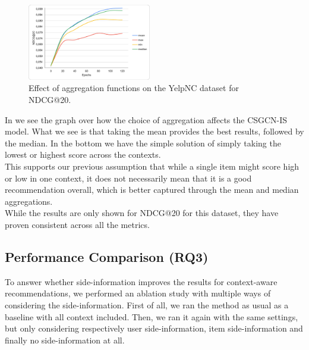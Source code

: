 \begin{figure}[hbt!]
	\centering
	\small	
	\includegraphics[width=0.48\textwidth]{figures/aggregation_effect.png}\vspace{-5pt}
	\caption{Effect of aggregation functions on the YelpNC dataset for NDCG@20.}\vspace{-10pt}
	\label{fig:aggregation_effect}
\end{figure}

In  we see the graph over how the choice of aggregation affects the CSGCN-IS model.
What we see is that taking the mean provides the best results, followed by the median.
In the bottom we have the simple solution of simply taking the lowest or highest score across the contexts.\\
This supports our previous assumption that while a single item might score high or low in one context, it does not necessarily mean that it is a good recommendation overall, which is better captured through the mean and median aggregations.\\
While the results are only shown for NDCG@20 for this dataset, they have proven consistent across all the metrics.



\subsection{Performance Comparison (RQ3)}
To answer whether side-information improves the results for context-aware recommendations, we performed an ablation study with multiple ways of considering the side-information.
First of all, we ran the method as usual as a baseline with all context included.
Then, we ran it again with the same settings, but only considering respectively user side-information, item side-information and finally no side-information at all.
